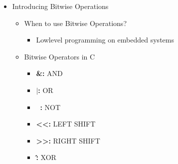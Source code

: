 \documentclass[12pt]{article}
\begin{document}
\bigskip

\begin{itemize}
    \item Introducing Bitwise Operations
    \begin{itemize}
        \item When to use Bitwise Operations?
        \begin{itemize}
            \item Lowlevel programming on embedded systems
        \end{itemize}
        \item Bitwise Operators in C
        \begin{itemize}
            \item \textbf{\&:} AND
            \item \textbf{$\mid$:} OR
            \item \textbf{~:} NOT
            \item \textbf{\textless\textless:} LEFT SHIFT
            \item \textbf{\textgreater\textgreater:} RIGHT SHIFT
            \item \textbf{\^:} XOR
        \end{itemize}
    \end{itemize}
\end{itemize}
\end{document}
